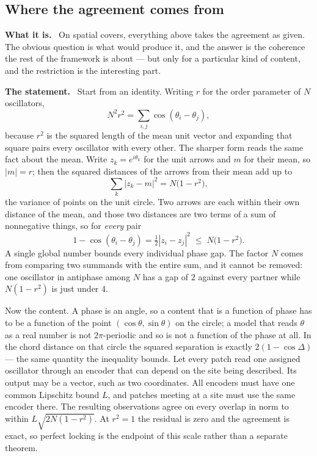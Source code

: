 \documentclass[11pt]{article}
\newcommand{\what}{\par\smallskip\noindent\textbf{What it is.}\ }
\newcommand{\statement}{\par\smallskip\noindent\textbf{The statement.}\ }
\begin{document}
\subsection{Where the agreement comes from}
\label{sec:coherence-agreement-primer}

\what
On spatial covers, everything above takes the agreement as given. The obvious question is what
would produce it, and the answer is the coherence the rest of the framework is
about --- but only for a particular kind of content, and the restriction is the
interesting part.

\statement
Start from an identity. Writing $r$ for the order parameter of $N$ oscillators,
\[
 N^{2}r^{2}=\sum_{i,j}\cos(\theta_i-\theta_j),
\]
because $r^2$ is the squared length of the mean unit vector and expanding that
square pairs every oscillator with every other. The sharper form reads the
same fact about the mean. Write $z_k=e^{i\theta_k}$ for the unit arrows and $m$
for their mean, so $|m|=r$; then the squared distances of the arrows from their
mean add up to
\[
 \sum_k|z_k-m|^{2}=N\bigl(1-r^{2}\bigr),
\]
the variance of points on the unit circle. Two arrows are each within their own
distance of the mean, and those two distances are two terms of a sum of
nonnegative things, so for \emph{every} pair
\[
 1-\cos(\theta_i-\theta_j)=\tfrac12|z_i-z_j|^{2}\;\le\;N\bigl(1-r^{2}\bigr).
\]
A single global number bounds every individual phase gap. The factor $N$ comes
from comparing two summands with the entire sum, and it cannot be removed: one
oscillator in antiphase among $N$ has a gap of $2$ against every partner while
$N(1-r^2)$ is just under $4$.

Now the content. A phase is an angle, so a content that is a function of phase
has to be a function of the point $(\cos\theta,\sin\theta)$ on the circle; a
model that reads $\theta$ as a real number is not $2\pi$-periodic and so is not
a function of the phase at all. In the chord distance on that circle the
squared separation is exactly $2(1-\cos\Delta)$ --- the same quantity the
inequality bounds. Let every patch read one assigned oscillator through an
encoder that can depend on the site being described. Its output may be a vector,
such as two coordinates. All encoders must have one common Lipschitz bound $L$,
and patches meeting at a site must use the same encoder there. The resulting
observations agree on every overlap in norm to within
$L\sqrt{2N(1-r^{2})}$. At $r^2=1$
the residual is zero and the agreement is exact, so perfect locking is the
endpoint of this scale rather than a separate theorem.
\end{document}
